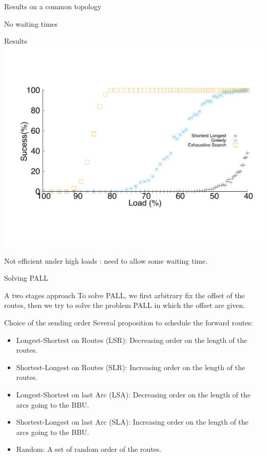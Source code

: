 \documentclass[10 pt]{beamer}
\begin{document}
\begin{section}{Results on a common topology}
\begin{subsection}{No waiting times}
\begin{frame}{Results}
\centering
  \includegraphics[scale=0.4]{echec_longues}\\
  \vspace{1cm}
  
  Not efficient under high loads : need to allow some waiting time.
\end{frame}
\end{subsection}

\begin{subsection}{Solving PALL}
\begin{frame}{A two stages approach}
To solve PALL, we first arbitrary fix the offset of the routes, then we try to solve the problem PALL in which the offset are given.
\end{frame}


\begin{frame}{Choice of the sending order}
 Several proposition to schedule the forward routes: 
\begin{itemize}
	
	 \item Longest-Shortest on Routes (LSR): Decreasing order on the length of the routes.
	 \item Shortest-Longest on Routes (SLR): Increasing order on the length of the routes. 
	 \item Longest-Shortest on last Arc (LSA): Decreasing order on the length of the arcs going to the BBU.
	 \item Shortest-Longest on last Arc (SLA): Increasing order on the length of the arcs going to the BBU.
	 \item Random: A set of random order of the routes.
	\end{itemize}


\end{frame}
\end{subsection}
\end{section}
\end{document}
